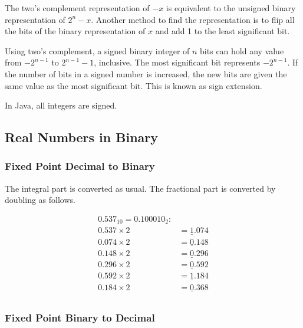 The two's complement representation of \( -x \) is equivalent to the unsigned binary representation of \( 2^n - x \).
Another method to find the representation is to flip all the bits of the binary representation of \( x \) and add \num{1} to the least significant bit.

Using two's complement, a signed binary integer of \( n \) bits can hold any value from \( - 2^{n-1} \) to \( 2^{n-1} - 1 \), inclusive.
The most significant bit represents \( - 2^{n-1} \).
If the number of bits in a signed number is increased, the new bits are given the same value as the most significant bit.
This is known as sign extension.

In Java, all integers are signed.

\subsection{Real Numbers in Binary}

\subsubsection{Fixed Point Decimal to Binary}

The integral part is converted as usual.
The fractional part is converted by doubling as follows.

\vspace{-\baselineskip}

\begin{align*}
  {0.537}_{10} = {0.100010}_{2} : & \\
  0.537 \times 2 &= \underline{1}.074 \\
  0.074 \times 2 &= \underline{0}.148 \\
  0.148 \times 2 &= \underline{0}.296 \\
  0.296 \times 2 &= \underline{0}.592 \\
  0.592 \times 2 &= \underline{1}.184 \\
  0.184 \times 2 &= \underline{0}.368 \\
\end{align*}

\subsubsection{Fixed Point Binary to Decimal}

